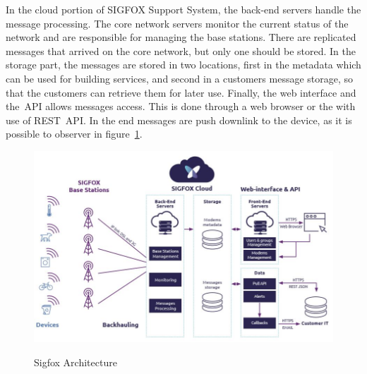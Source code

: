 In the cloud portion of SIGFOX Support System, the back-end servers handle the message processing. The core network servers monitor the current status of the network and are responsible for managing the base stations. There are replicated messages that arrived on the core network, but only one should be stored. In the storage part, the messages are stored in  two locations, first in the metadata which can be used for building services, and second in a customers message storage, so that the customers can retrieve them for later use. Finally, the web interface and the~\gls{API} allows messages access. This is done through a web browser or the with use of REST~\gls{API}. In the end messages are  push downlink to the device, as it is possible to observer in figure~\ref{fig:Sigfox_Architecture}.\\

\begin{figure}[htbp]
  \centering
  
    {\includegraphics[height=3 in,width=0.75\linewidth]{Chapters/Figures/SigfoxArchitecture.JPG}}%
 
  \caption{Sigfox Architecture~\cite{SIGTECH}}
  \label{fig:Sigfox_Architecture}
\end{figure}

